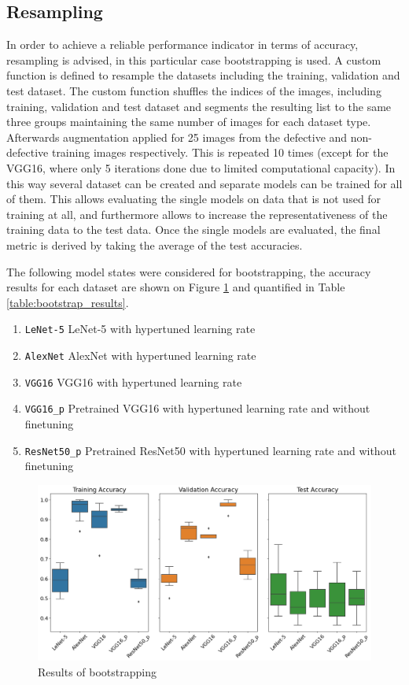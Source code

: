 \documentclass[10pt, final]{article}
\begin{document}
\subsection{Resampling}
In order to achieve a reliable performance indicator in terms of accuracy, resampling is advised, in this particular
case bootstrapping is used.
A custom function is defined to resample the datasets including the training, validation and test dataset.
The custom function shuffles the indices of the images, including training, validation and test dataset and segments
the resulting list to the same three groups maintaining the same number of images for each dataset type.
Afterwards augmentation applied for 25 images from the defective and non-defective training images respectively.
This is repeated 10 times (except for the VGG16, where only 5 iterations done due to limited computational capacity).
In this way several dataset can be created and separate models can be trained for all of them.
This allows evaluating the single models on data that is not used for training at all, and furthermore allows to increase
the representativeness of the training data to the test data.
Once the single models are evaluated, the final metric is derived by taking the average of the test accuracies.

The following model states were considered for bootstrapping, the accuracy results for each dataset are shown on
Figure \ref{fig:bootstrap_results} and quantified in Table \ref{table:bootstrap_results}.

\begin{enumerate}
	\item \lstinline{LeNet-5} LeNet-5 with hypertuned learning rate
	\item \lstinline{AlexNet} AlexNet with hypertuned learning rate
	\item \lstinline{VGG16} VGG16 with hypertuned learning rate
	\item \lstinline{VGG16_p} Pretrained VGG16 with hypertuned learning rate and without finetuning
	\item \lstinline{ResNet50_p} Pretrained ResNet50 with hypertuned learning rate and without finetuning
\end{enumerate}

\begin{figure}[!ht]
	\centering
	\includegraphics[width=\textwidth]{./tex_graphs/bootstrap_results.png}
	\caption{Results of bootstrapping}
	\label{fig:bootstrap_results}
\end{figure}
\end{document}
